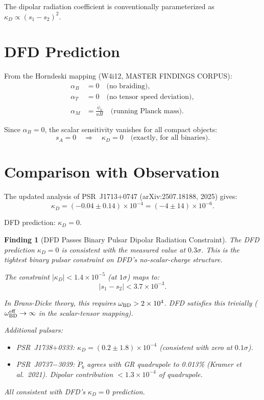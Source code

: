 \documentclass[11pt]{article}
\newtheorem{finding}{Finding}
\newcommand{\ee}[1]{\times 10^{#1}}
\begin{document}
The dipolar radiation coefficient is conventionally parameterized as
$\kappa_D \propto (s_1 - s_2)^2$.

\section{DFD Prediction}

From the Horndeski mapping (W4i12, MASTER FINDINGS CORPUS):
\begin{align}
\alpha_B &= 0 \quad \text{(no braiding)}, \\
\alpha_T &= 0 \quad \text{(no tensor speed deviation)}, \\
\alpha_M &= \frac{\dot{\psi}_0}{aH} \quad \text{(running Planck mass)}.
\end{align}

Since $\alpha_B = 0$, the scalar sensitivity vanishes for all
compact objects:
\begin{equation}
s_A = 0 \quad \Rightarrow \quad \kappa_D = 0 \quad
\text{(exactly, for all binaries)}.
\end{equation}

\section{Comparison with Observation}

The updated analysis of PSR~J1713$+$0747 (arXiv:2507.18188, 2025)
gives:
\begin{equation}
\kappa_D = (-0.04 \pm 0.14)\ee{-4}
= (-4 \pm 14)\ee{-6}.
\end{equation}

DFD prediction: $\kappa_D = 0$.

\begin{finding}[DFD Passes Binary Pulsar Dipolar Radiation Constraint]
\label{find:dipolar}
The DFD prediction $\kappa_D = 0$ is consistent with the measured
value at $0.3\sigma$. This is the tightest binary pulsar constraint
on DFD's no-scalar-charge structure.

The constraint $|\kappa_D| < 1.4\ee{-5}$ (at $1\sigma$) maps to:
\begin{equation}
|s_1 - s_2| < 3.7\ee{-3}.
\end{equation}

In Brans-Dicke theory, this requires $\omega_{\rm BD} > 2\ee{4}$.
DFD satisfies this trivially ($\omega_{\rm BD}^{\rm eff} \to \infty$
in the scalar-tensor mapping).

Additional pulsars:
\begin{itemize}[nosep]
\item PSR~J1738$+$0333: $\kappa_D = (0.2 \pm 1.8)\ee{-4}$
  (consistent with zero at $0.1\sigma$).
\item PSR~J0737$-$3039: $\dot{P}_b$ agrees with GR quadrupole to
  0.013\% (Kramer et al.\ 2021). Dipolar contribution
  $< 1.3\ee{-4}$ of quadrupole.
\end{itemize}

All consistent with DFD's $\kappa_D = 0$ prediction.
\end{finding}
\end{document}
